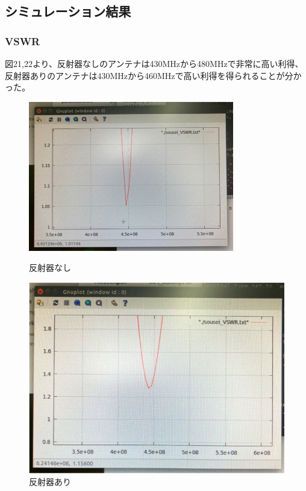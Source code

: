 \documentclass[dvipdfmx,autodetect-engine,titlepage]{jsarticle}
\begin{document}
\subsection{シミュレーション結果}
\subsubsection{VSWR}
図21,22より、反射器なしのアンテナは430MHzから480MHzで非常に高い利得、反射器ありのアンテナは430MHzから460MHzで高い利得を得られることが分かった。\\

\begin{figure}[H]
  \centering
  \begin{minipage}[b]{0.45\linewidth}
  \begin{center}
    \includegraphics[keepaspectratio,scale=0.5]{fg11.jpg}
    \end{center}
    \caption{反射器なし}
  \end{minipage}
  \begin{minipage}[b]{0.45\linewidth}
  \begin{center}
    \includegraphics[keepaspectratio,scale=0.5]{fg12.png}
    \end{center}
    \caption{反射器あり}
  \end{minipage}
\end{figure}
\end{document}
